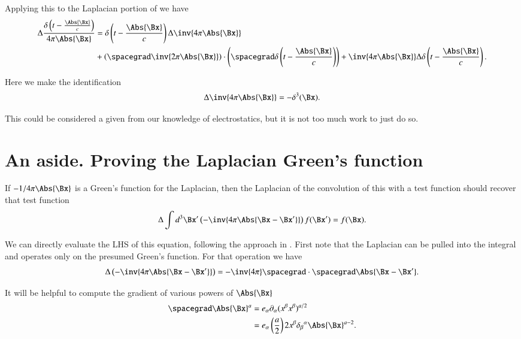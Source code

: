 Applying this to the Laplacian portion of  we have
%
\begin{equation}\label{eqn:relativisticElectrodynamicsL18:131}
\begin{aligned}
\Delta \frac{\delta\left(t - \frac{\Abs{\Bx}}{c}\right)}{4 \pi \Abs{\Bx} }
&=
\delta\left(t - \frac{\Abs{\Bx}}{c}\right)
\Delta
\inv{4 \pi \Abs{\Bx} } \\
&+\left(\spacegrad \inv{2 \pi \Abs{\Bx} }\right)
\cdot
\left(
\spacegrad
\delta\left(t - \frac{\Abs{\Bx}}{c}\right) \right)
+
\inv{4 \pi \Abs{\Bx} }
\Delta
\delta\left(t - \frac{\Abs{\Bx}}{c}\right).
\end{aligned}
\end{equation}

Here we make the identification
%
\begin{equation}\label{eqn:relativisticElectrodynamicsL18:132}
\Delta \inv{4 \pi \Abs{\Bx} } = - \delta^3(\Bx).
\end{equation}

This could be considered a given from our knowledge of electrostatics, but it is not too much work to just do so.
%
\section{An aside.  Proving the Laplacian Green's function}

If \(-1/{4 \pi \Abs{\Bx} }\) is a Green's function for the Laplacian, then the Laplacian of the convolution of this with a test function should recover that test function
%
\begin{equation}\label{eqn:relativisticElectrodynamicsL18:133}
\Delta \int d^3 \Bx' \left(-\inv{4 \pi \Abs{\Bx - \Bx'} } \right) f(\Bx') = f(\Bx).
\end{equation}

We can directly evaluate the LHS of this equation, following the approach in \citep{schwartz1987pe}.  First note that the Laplacian can be pulled into the integral and operates only on the presumed Green's function.  For that operation we have
%
\begin{equation}\label{eqn:relativisticElectrodynamicsL18:134}
\Delta \left(-\inv{4 \pi \Abs{\Bx - \Bx'} } \right)
=
-\inv{4 \pi} \spacegrad \cdot \spacegrad \Abs{\Bx - \Bx'}.
\end{equation}

It will be helpful to compute the gradient of various powers of \(\Abs{\Bx}\)
%
\begin{equation}\label{eqn:relativisticElectrodynamicsL18:780}
\begin{aligned}
\spacegrad \Abs{\Bx}^a
&=
e_\alpha \partial_\alpha (x^\beta x^\beta)^{a/2} \\
&=
e_\alpha \left(\frac{a}{2}\right) 2 x^\beta {\delta_\beta}^\alpha \Abs{\Bx}^{a - 2}.
\end{aligned}
\end{equation}

